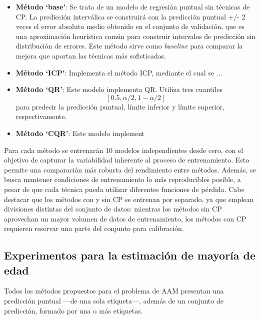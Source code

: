 \begin{itemize}
    \item \textbf{Método `base'}: Se trata de un modelo de regresión puntual sin técnicas de CP. La predicción 
    interválica se construirá con la predicción puntual +/- 2 veces el error absoluto medio obtenido en el
    conjunto de validación, que es una aproximación heurística común para construir intervalos de predicción 
    sin distribución de errores.
    Este método sirve como \textit{baseline} para comparar la mejora que aportan las técnicas más 
    sofisticadas.

    \item \textbf{Método `ICP'}: Implementa el método ICP, mediante el cual se ...
    
    \item \textbf{Método `QR'}: Este modelo implementa QR. Utiliza tres cuantiles 
    $$
    [0.5, \alpha/2, 1-\alpha/2]
    $$ 
    para predecir la predicción puntual, límite inferior y límite superior, respectivamente.

    \item \textbf{Método `CQR'}: Este modelo implement

\end{itemize} 

Para cada método se entrenarán 10 modelos independientes desde cero, con el objetivo de capturar la 
variabilidad inherente al proceso de entrenamiento. Esto permite una comparación más robusta del rendimiento 
entre métodos. Además, se busca mantener condiciones de entrenamiento lo más reproducibles posible, a pesar 
de que cada técnica pueda utilizar diferentes funciones de pérdida. Cabe destacar que los métodos con y sin 
CP se entrenan por separado, ya que emplean divisiones distintas del conjunto de datos: mientras los métodos 
sin CP aprovechan un mayor volumen de datos de entrenamiento, los métodos con CP requieren reservar una parte 
del conjunto para calibración.


\subsection{Experimentos para la estimación de mayoría de edad}

Todos los métodos propuestos para el problema de AAM presentan una predicción puntual ---de una sola 
etiqueta---, además de un conjunto de predicción, formado por una o más etiquetas. 

